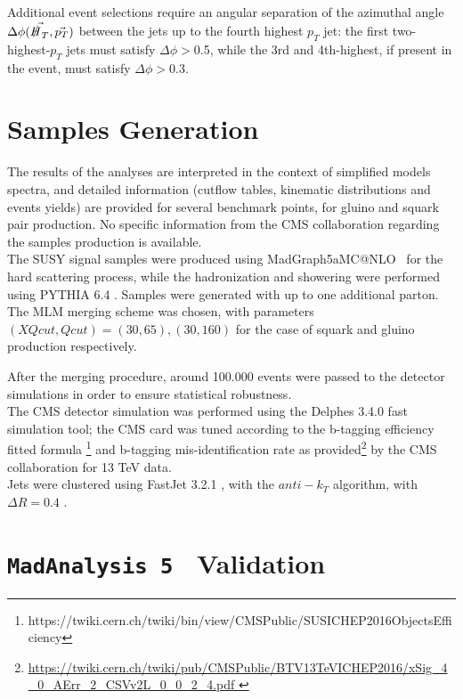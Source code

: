 \documentclass[12pt,A4paper
english, %
singlespacing, %
parskip, %
headsepline, %
]{article}
\makeatletter
\newcommand{\amc}{{\sc MadGraph5\textunderscore}a{\sc MC@NLO}}
\newcommand{\MAD}{\texttt{MadAnalysis 5}}
\makeatother
\begin{document}
Additional event selections require an angular separation of the azimuthal angle $\Delta \phi(\vec{\slashed{H}_T},\vec{p_T})$  between the jets up to the fourth highest $p_T$ jet: the first two-highest-$p_T$ jets must satisfy $\Delta \phi>$0.5, while the 3rd and 4th-highest, if present in the event, must satisfy $\Delta \phi>$0.3.
\\

\section{Samples Generation}
The results of the analyses are interpreted in the context of simplified models spectra, and detailed information (cutflow tables, kinematic distributions and events yields) are provided for several benchmark points, for gluino and squark pair production. No specific information from the CMS collaboration regarding the samples production is available. 
\\

The SUSY signal samples were produced using \amc~\cite{Alwall:2011uj,Alwall:2014hca} for the hard scattering process, while the hadronization and showering were performed using {\sc PYTHIA 6.4} \cite{Sjostrand:2006za}. Samples were generated with up to one additional parton. The MLM merging scheme was chosen, with parameters $(XQcut,Qcut)=(30,65),(30,160)$ for the case of squark and gluino production respectively.

After the merging procedure, around 100.000 events were passed to the detector simulations in order to ensure statistical robustness. 
\\

The CMS detector simulation was performed using the {\sc Delphes 3.4.0}\cite{deFavereau:2013fsa} fast simulation tool; the CMS card was tuned according to the b-tagging efficiency fitted formula \footnote{https://twiki.cern.ch/twiki/bin/view/CMSPublic/SUSICHEP2016ObjectsEfficiency} and b-tagging mis-identification rate as provided\footnote{ \url{
https://twiki.cern.ch/twiki/pub/CMSPublic/BTV13TeVICHEP2016/xSig\_4\_0\_AErr\_2\_CSVv2L\_0\_0\_2\_4.pdf
}} by the CMS collaboration for 13 TeV data.
\\

Jets were clustered using {\sc FastJet} 3.2.1 \cite{Cacciari:2011ma}, with the $anti-k_T$ \cite{Cacciari:2008gp} algorithm, with $\Delta R = 0.4$ .
\\

\clearpage
\section{\MAD~ Validation}
\end{document}
